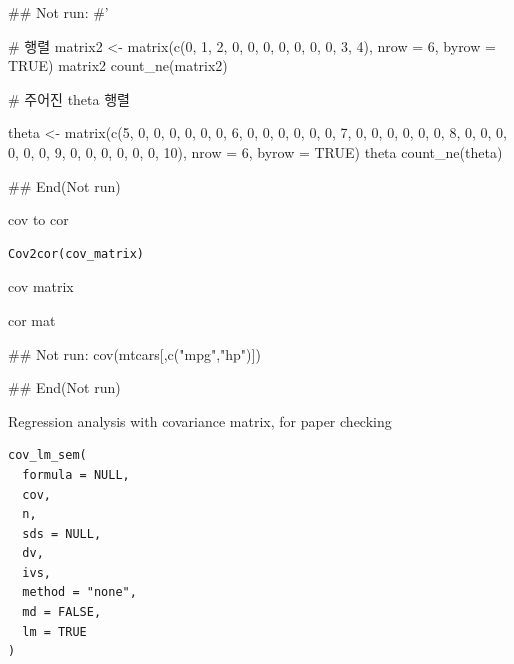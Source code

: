 \documentclass[a4paper]{book}
\begin{document}
\begin{Examples}
\begin{ExampleCode}

## Not run: 
#'

#  행렬
matrix2 <- matrix(c(0, 1, 2, 0, 0, 0,
                    0, 0, 0, 0, 3, 4), nrow = 6, byrow = TRUE)
matrix2
count_ne(matrix2)

# 주어진 theta 행렬

theta <- matrix(c(5, 0, 0, 0, 0, 0,
                  0, 6, 0, 0, 0, 0,
                  0, 0, 7, 0, 0, 0,
                  0, 0, 0, 8, 0, 0,
                  0, 0, 0, 0, 9, 0,
                  0, 0, 0, 0, 0, 10), nrow = 6, byrow = TRUE)
theta
count_ne(theta)

## End(Not run)

\end{ExampleCode}
\end{Examples}
%
\begin{Description}
cov to cor
\end{Description}
%
\begin{Usage}
\begin{verbatim}
Cov2cor(cov_matrix)
\end{verbatim}
\end{Usage}
%
\begin{Arguments}
\begin{ldescription}
\item[\code{cov\_matrix}] cov matrix
\end{ldescription}
\end{Arguments}
%
\begin{Value}
cor mat
\end{Value}
%
\begin{Examples}
\begin{ExampleCode}

## Not run: 
cov(mtcars[,c("mpg","hp")])%

## End(Not run)
\end{ExampleCode}
\end{Examples}
%
\begin{Description}
Regression analysis with covariance matrix, for paper checking
\end{Description}
%
\begin{Usage}
\begin{verbatim}
cov_lm_sem(
  formula = NULL,
  cov,
  n,
  sds = NULL,
  dv,
  ivs,
  method = "none",
  md = FALSE,
  lm = TRUE
)
\end{verbatim}
\end{Usage}
\end{document}
